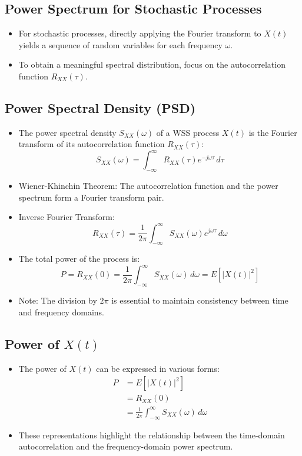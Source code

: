 \documentclass[12pt]{article}
\begin{document}
\subsection{Power Spectrum for Stochastic Processes}
\begin{itemize}
    \item For stochastic processes, directly applying the Fourier transform to \( X(t) \) yields a sequence of random variables for each frequency \( \omega \).
    \item To obtain a meaningful spectral distribution, focus on the autocorrelation function \( R_{XX}(\tau) \).
\end{itemize}

\subsection{Power Spectral Density (PSD)}
\begin{itemize}
    \item The power spectral density \( S_{XX}(\omega) \) of a WSS process \( X(t) \) is the Fourier transform of its autocorrelation function \( R_{XX}(\tau) \):
    \[
    S_{XX}(\omega) = \int_{-\infty}^{\infty} R_{XX}(\tau) e^{-j\omega \tau} \, d\tau
    \]
    \item Wiener-Khinchin Theorem: The autocorrelation function and the power spectrum form a Fourier transform pair.
    \item Inverse Fourier Transform:
    \[
    R_{XX}(\tau) = \frac{1}{2\pi} \int_{-\infty}^{\infty} S_{XX}(\omega) e^{j\omega \tau} \, d\omega
    \]
    \item The total power of the process is:
    \[
    P = R_{XX}(0) = \frac{1}{2\pi} \int_{-\infty}^{\infty} S_{XX}(\omega) \, d\omega = E[|X(t)|^2]
    \]
    \item Note: The division by \( 2\pi \) is essential to maintain consistency between time and frequency domains.
\end{itemize}

\subsection{Power of \( X(t) \)}
\begin{itemize}
    \item The power of \( X(t) \) can be expressed in various forms:
    \begin{align*}
        P &= E[|X(t)|^2] \\
        &= R_{XX}(0) \\
        &= \frac{1}{2\pi} \int_{-\infty}^{\infty} S_{XX}(\omega) \, d\omega
    \end{align*}
    \item These representations highlight the relationship between the time-domain autocorrelation and the frequency-domain power spectrum.
\end{itemize}
\end{document}

